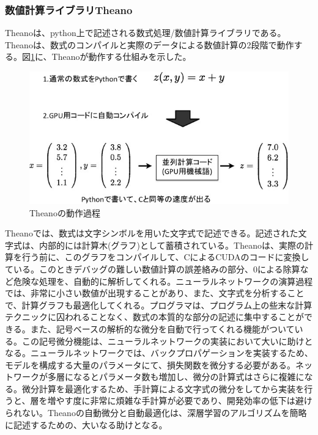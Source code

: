 \subsubsection{数値計算ライブラリTheano}
Theanoは、python上で記述される数式処理/数値計算ライブラリである。Theanoは、数式のコンパイルと実際のデータによる数値計算の2段階で動作する\cite{bergstra2010theano:}。図\ref{c4_Theano_compile}に、Theanoが動作する仕組みを示した。
\begin{figure}[tbp]
 \centering
  \includegraphics[width=120mm]{img/c4/theano_compile}
 \caption{Theanoの動作過程}
 \label{c4_Theano_compile}
\end{figure}
Theanoでは、数式は文字シンボルを用いた文字式で記述できる。記述された文字式は、内部的には計算木(グラフ)として蓄積されている。Theanoは、実際の計算を行う前に、このグラフをコンパイルして、CによるCUDAのコードに変換している。このときデバッグの難しい数値計算の誤差絡みの部分、0による除算など危険な処理を、自動的に解析してくれる。ニューラルネットワークの演算過程では、非常に小さい数値が出現することがあり、また、文字式を分析することで、計算グラフも最適化してくれる。プログラマは、プログラム上の些末な計算テクニックに囚われることなく、数式の本質的な部分の記述に集中することができる。また、記号ベースの解析的な微分を自動で行ってくれる機能がついている。この記号微分機能は、ニューラルネットワークの実装において大いに助けとなる。ニューラルネットワークでは、バックプロパゲーションを実装するため、モデルを構成する大量のパラメータにて、損失関数を微分する必要がある。ネットワークが多層になるとパラメータ数も増加し、微分の計算式はさらに複雑になる。微分計算を最適化するため、手計算による文字式の微分をしてから実装を行うと、層を増やす度に非常に煩雑な手計算が必要であり、開発効率の低下は避けられない。Theanoの自動微分と自動最適化は、深層学習のアルゴリズムを簡略に記述するための、大いなる助けとなる。

